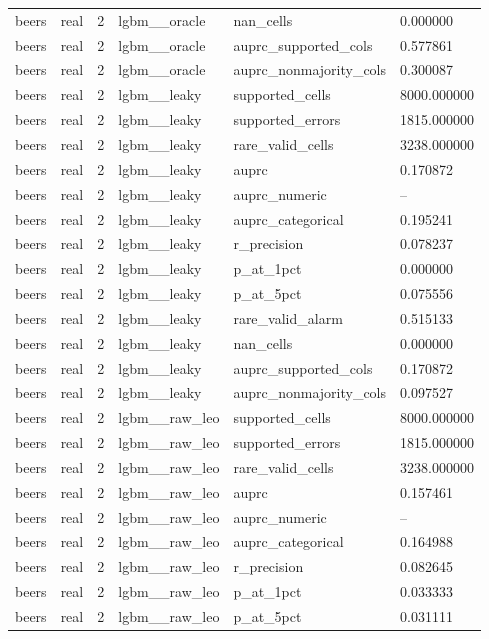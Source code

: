 \begin{tabular}{llllll}
beers & real & 2 & lgbm\_\_oracle & nan\_cells & 0.000000 \\
beers & real & 2 & lgbm\_\_oracle & auprc\_supported\_cols & 0.577861 \\
beers & real & 2 & lgbm\_\_oracle & auprc\_nonmajority\_cols & 0.300087 \\
beers & real & 2 & lgbm\_\_leaky & supported\_cells & 8000.000000 \\
beers & real & 2 & lgbm\_\_leaky & supported\_errors & 1815.000000 \\
beers & real & 2 & lgbm\_\_leaky & rare\_valid\_cells & 3238.000000 \\
beers & real & 2 & lgbm\_\_leaky & auprc & 0.170872 \\
beers & real & 2 & lgbm\_\_leaky & auprc\_numeric & -- \\
beers & real & 2 & lgbm\_\_leaky & auprc\_categorical & 0.195241 \\
beers & real & 2 & lgbm\_\_leaky & r\_precision & 0.078237 \\
beers & real & 2 & lgbm\_\_leaky & p\_at\_1pct & 0.000000 \\
beers & real & 2 & lgbm\_\_leaky & p\_at\_5pct & 0.075556 \\
beers & real & 2 & lgbm\_\_leaky & rare\_valid\_alarm & 0.515133 \\
beers & real & 2 & lgbm\_\_leaky & nan\_cells & 0.000000 \\
beers & real & 2 & lgbm\_\_leaky & auprc\_supported\_cols & 0.170872 \\
beers & real & 2 & lgbm\_\_leaky & auprc\_nonmajority\_cols & 0.097527 \\
beers & real & 2 & lgbm\_\_raw\_leo & supported\_cells & 8000.000000 \\
beers & real & 2 & lgbm\_\_raw\_leo & supported\_errors & 1815.000000 \\
beers & real & 2 & lgbm\_\_raw\_leo & rare\_valid\_cells & 3238.000000 \\
beers & real & 2 & lgbm\_\_raw\_leo & auprc & 0.157461 \\
beers & real & 2 & lgbm\_\_raw\_leo & auprc\_numeric & -- \\
beers & real & 2 & lgbm\_\_raw\_leo & auprc\_categorical & 0.164988 \\
beers & real & 2 & lgbm\_\_raw\_leo & r\_precision & 0.082645 \\
beers & real & 2 & lgbm\_\_raw\_leo & p\_at\_1pct & 0.033333 \\
beers & real & 2 & lgbm\_\_raw\_leo & p\_at\_5pct & 0.031111 \\

\end{tabular}
